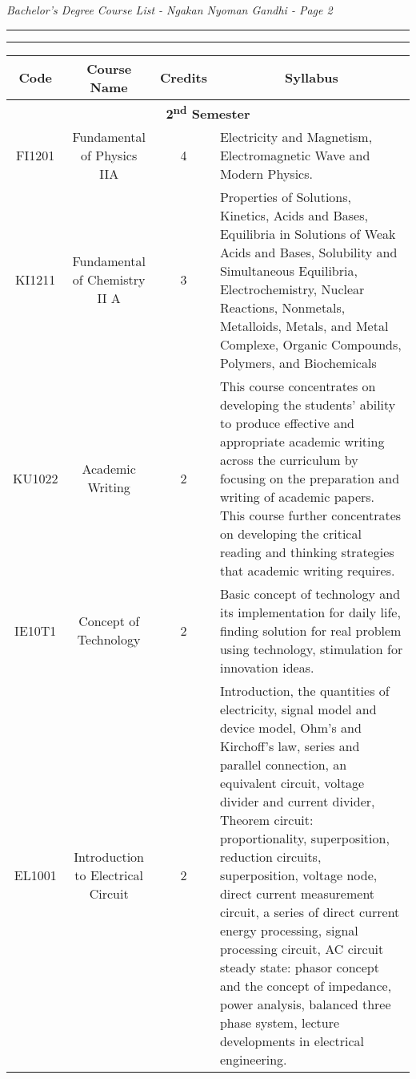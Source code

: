 \documentclass{article}
\begin{document}
    \begin{center}
        \begin{flushleft}
            \textit{\textit{Bachelor's Degree Course List - Ngakan Nyoman Gandhi - Page 2}}
        \end{flushleft} 
        
        \normalsize

        \hrule
        \vspace{1pt}
        \hrule height 1pt

        \bigskip

        \begin{tabular}{ | c | c | c | p{6.8cm} |} %
            \hline
            \textbf{Code} & \textbf{Course Name} & \textbf{Credits} & \multicolumn{1}{c|}{\textbf{Syllabus}}\\\hline

            \hline\multicolumn{4}{|c|}{\cellcolor[gray]{0.80}\textbf{2\textsuperscript{nd} Semester}}	\\ \cline{1-4}  
            
	    FI1201 & Fundamental of Physics IIA & 4 & Electricity and Magnetism, Electromagnetic Wave and Modern Physics.   \\ \hline     
			
            KI1211 & Fundamental of Chemistry II A & 3 & Properties of Solutions, Kinetics, Acids and Bases, Equilibria   in Solutions of Weak Acids and Bases, Solubility and Simultaneous Equilibria, Electrochemistry, Nuclear Reactions, Nonmetals, Metalloids, Metals, and Metal Complexe, Organic Compounds, Polymers, and Biochemicals \\ \hline
                
            KU1022 & Academic Writing & 2 & This course concentrates on developing the students' ability to produce effective and appropriate academic writing across the curriculum by focusing on the preparation and writing of academic papers. This course further concentrates on developing the critical reading and thinking strategies that academic writing requires. \\ \hline   
            
            IE10T1 & Concept of Technology & 2 & Basic concept of technology and its implementation for daily life, finding solution for real problem using technology, stimulation for innovation ideas. \\ \hline
            
            EL1001 & Introduction to Electrical Circuit & 2 & Introduction, the quantities of electricity, signal model and device model, Ohm's and Kirchoff's law, series and parallel connection, an equivalent circuit, voltage divider and current divider, Theorem circuit: proportionality, superposition, reduction circuits, superposition, voltage node, direct current measurement circuit, a series of direct current energy processing, signal processing circuit, AC circuit steady state: phasor concept and the concept of impedance, power analysis, balanced three phase system, lecture developments in electrical engineering. \\ \hline  
            

\end{tabular}
\end{center}
\end{document}
